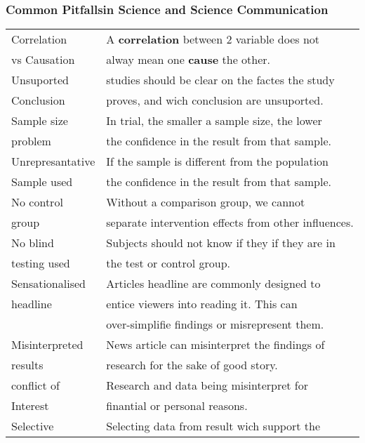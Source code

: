 \documentclass[5pt]{article}
\begin{document}
\begin{multicols}{2}
\subsubsection{Common Pitfallsin Science and Science Communication}
\begin{tabular}{ll}
    Correlation         & A \textbf{correlation} between 2 variable does not\\
    vs Causation        & alway mean one \textbf{cause} the other.\\
    \hline
    Unsuported          & studies should be clear on the factes the study\\
    Conclusion          &  proves, and wich conclusion are unsuported.\\
    \hline
    Sample size         & In trial, the smaller a sample size, the lower\\
    problem             & the confidence in the result from that sample.\\
    \hline
    Unrepresantative    & If the sample is different from the population\\
    Sample used         & the confidence in the result from that sample.\\
    \hline
    No control          & Without a comparison group, we cannot\\
    group               & \small{separate intervention effects from other influences.}\\
    \hline
    No blind            & Subjects should not know if they if they are in\\
    testing used        & the test or control group.\\
    \hline
    Sensationalised     & Articles headline are commonly designed to\\
    headline            & entice viewers into reading it. This can\\
                        & over-simplifie findings or misrepresent them.\\
    \hline
    Misinterpreted      & News article can misinterpret the findings of\\
    results             & research for the sake of good story.\\
    \hline
    conflict of         & Research and data being misinterpret for\\
    Interest            & finantial or personal reasons.\\
    \hline
    Selective           & Selecting data from result wich support the\\

\end{tabular}
\end{multicols}
\end{document}

